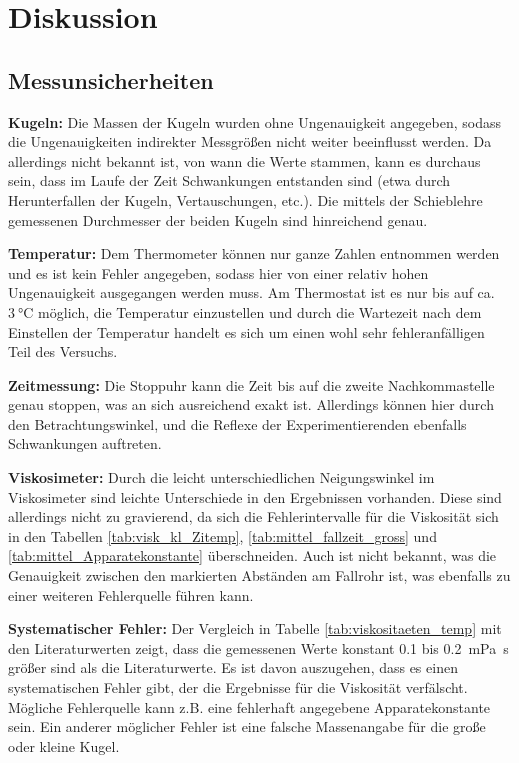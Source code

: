 \section{Diskussion}

\subsection[]{Messunsicherheiten}
\textbf{Kugeln:}
Die Massen der Kugeln wurden ohne Ungenauigkeit angegeben, sodass die Ungenauigkeiten indirekter Messgrößen nicht weiter beeinflusst werden.
Da allerdings nicht bekannt ist, von wann die Werte stammen, kann es durchaus sein, dass im Laufe der Zeit Schwankungen entstanden sind
(etwa durch Herunterfallen der Kugeln, Vertauschungen, etc.).
Die mittels der Schieblehre gemessenen Durchmesser der beiden Kugeln sind hinreichend genau.

\noindent
\textbf{Temperatur:}
Dem Thermometer können nur ganze Zahlen entnommen werden und es ist kein Fehler angegeben, sodass hier von einer relativ hohen Ungenauigkeit ausgegangen werden muss.
Am Thermostat ist es nur bis auf ca. $\qty{3}{\degreeCelsius}$ möglich, die Temperatur einzustellen und durch die Wartezeit nach dem Einstellen der Temperatur
handelt es sich um einen wohl sehr fehleranfälligen Teil des Versuchs.

\noindent
\textbf{Zeitmessung:}
Die Stoppuhr kann die Zeit bis auf die zweite Nachkommastelle genau stoppen, was an sich ausreichend exakt ist.
Allerdings können hier durch den Betrachtungswinkel, und die Reflexe der Experimentierenden ebenfalls Schwankungen auftreten.

\noindent
\textbf{Viskosimeter:}
Durch die leicht unterschiedlichen Neigungswinkel im Viskosimeter sind leichte Unterschiede in den Ergebnissen vorhanden.
Diese sind allerdings nicht zu gravierend, da sich die Fehlerintervalle für die Viskosität sich in den Tabellen
 \ref{tab:visk_kl_Zitemp}, \ref{tab:mittel_fallzeit_gross} und \ref{tab:mittel_Apparatekonstante} überschneiden.
Auch ist nicht bekannt, was die Genauigkeit zwischen den markierten Abständen am Fallrohr ist, was ebenfalls zu einer weiteren Fehlerquelle führen kann.

\noindent
\textbf{Systematischer Fehler:} 
Der Vergleich in Tabelle \ref{tab:viskositaeten_temp} mit den Literaturwerten zeigt, 
dass die gemessenen Werte konstant \num{0.1} bis \qty{0.2}{\milli\pascal\s} größer sind als die Literaturwerte. 
Es ist davon auszugehen, dass es einen systematischen Fehler gibt, der die Ergebnisse für die
Viskosität verfälscht.
Mögliche Fehlerquelle kann z.B. eine fehlerhaft angegebene Apparatekonstante sein.
Ein anderer möglicher Fehler ist eine falsche Massenangabe für die große oder kleine Kugel.

